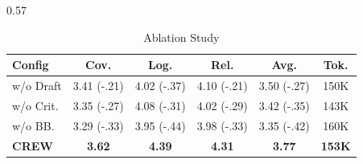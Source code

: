 \begin{frame}[t]
\begin{columns}[T]
    \begin{column}{0.57\textwidth}
        \begin{table}[H]
            \caption{Ablation Study}
            \centering
            \tiny
            \vspace{-1.5mm} %
            \begin{tabular}{l c c c c c}
            \toprule
            \textbf{Config} & \textbf{Cov.} & \textbf{Log.} & \textbf{Rel.} & \textbf{Avg.} & \textbf{Tok.} \\
            \midrule
            w/o Draft & 3.41 {\color{red}\tiny(-.21)} & 4.02 {\color{red}\tiny(-.37)} & 4.10 {\color{red}\tiny(-.21)} & 3.50 {\color{red}\tiny(-.27)} & 150K \\
            w/o Crit. & 3.35 {\color{red}\tiny(-.27)} & 4.08 {\color{red}\tiny(-.31)} & 4.02 {\color{red}\tiny(-.29)} & 3.42 {\color{red}\tiny(-.35)} & 143K \\
            w/o BB. & 3.29 {\color{red}\tiny(-.33)} & 3.95 {\color{red}\tiny(-.44)} & 3.98 {\color{red}\tiny(-.33)} & 3.35 {\color{red}\tiny(-.42)} & 160K \\
            \midrule
            \textbf{CREW} & \textbf{3.62} & \textbf{4.39} & \textbf{4.31} & \textbf{3.77} & \textbf{153K} \\
            \bottomrule
            \end{tabular}
        \end{table}
    \end{column}
\end{columns}

\vfill
{}
\end{frame}